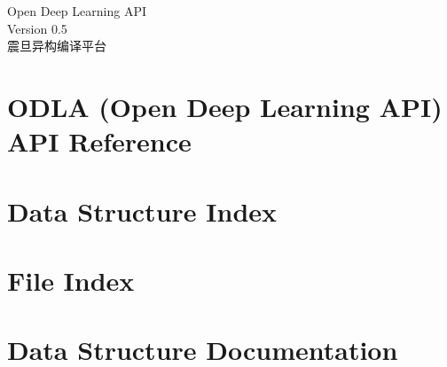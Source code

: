 \documentclass[twoside]{book}
\newcommand{\+}{\discretionary{\mbox{\scriptsize$\hookleftarrow$}}{}{}}
\newcommand{\clearemptydoublepage}{%
  \newpage{\pagestyle{empty}\cleardoublepage}%
}
\begin{document}
\hypersetup{pageanchor=false,
             bookmarksnumbered=true,
             pdfencoding=unicode
            }
\begin{titlepage}
\vspace*{7cm}
\begin{center}%
{\Large Open Deep Learning API}\\
\vspace*{1cm}
{\large Version 0.5}\\
\vspace*{2cm}
{\large 震旦异构编译平台} \\
\end{center}
\end{titlepage}
\clearemptydoublepage
{}
\tableofcontents
\clearemptydoublepage
{}
\hypersetup{pageanchor=true}
\chapter{ODLA (Open Deep Learning API) API Reference}
\label{index}\hypertarget{index}{}
\chapter{Data Structure Index}

\chapter{File Index}

\chapter{Data Structure Documentation}








\end{document}
